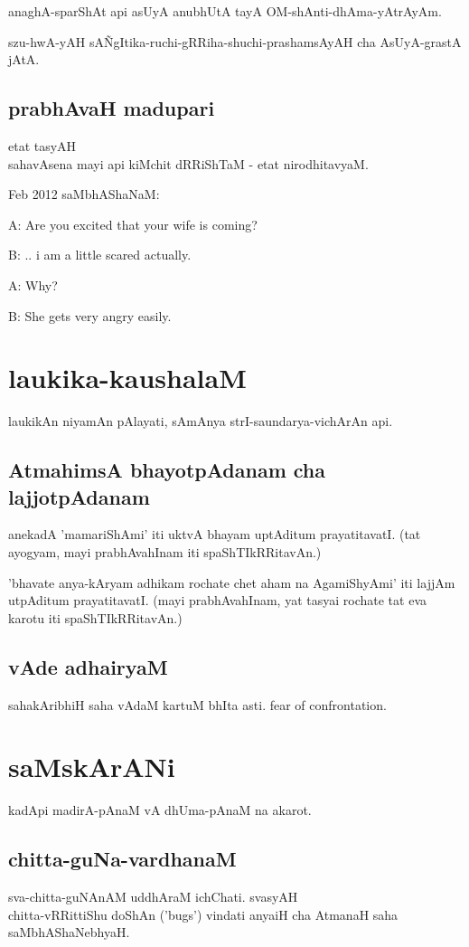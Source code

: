 \documentclass[oneside, article]{memoir}
\begin{document}
anaghA-sparShAt api asUyA anubhUtA tayA OM-shAnti-dhAma-yAtrAyAm.

szu-hwA-yAH sA\~NgItika-ruchi-gRRiha-shuchi-prashamsAyAH cha AsUyA-grastA jAtA.

\subsection{prabhAvaH madupari}
etat tasyAH \\sahavAsena mayi api kiMchit dRRiShTaM - etat nirodhitavyaM.

Feb 2012 saMbhAShaNaM:

A: Are you excited that your wife is coming?

B: .. i am a little scared actually.

A: Why?

B: She gets very angry easily. 


\section{laukika-kaushalaM}
laukikAn niyamAn pAlayati, sAmAnya strI-saundarya-vichArAn api. 

\subsection{AtmahimsA bhayotpAdanam cha lajjotpAdanam}
anekadA 'mamariShAmi' iti uktvA bhayam uptAditum prayatitavatI. (tat ayogyam, mayi prabhAvahInam iti spaShTIkRRitavAn.)

'bhavate anya-kAryam adhikam rochate chet aham na AgamiShyAmi' iti lajjAm utpAditum prayatitavatI. (mayi prabhAvahInam, yat tasyai rochate tat eva karotu iti spaShTIkRRitavAn.)

\subsection{vAde adhairyaM}
sahakAribhiH saha vAdaM kartuM bhIta asti. fear of confrontation.

\section{saMskArANi}
kadApi madirA-pAnaM vA dhUma-pAnaM na akarot.

\subsection{chitta-guNa-vardhanaM}
sva-chitta-guNAnAM uddhAraM ichChati. svasyAH \\chitta-vRRittiShu doShAn ('bugs') vindati anyaiH cha AtmanaH saha saMbhAShaNebhyaH.
\end{document}
